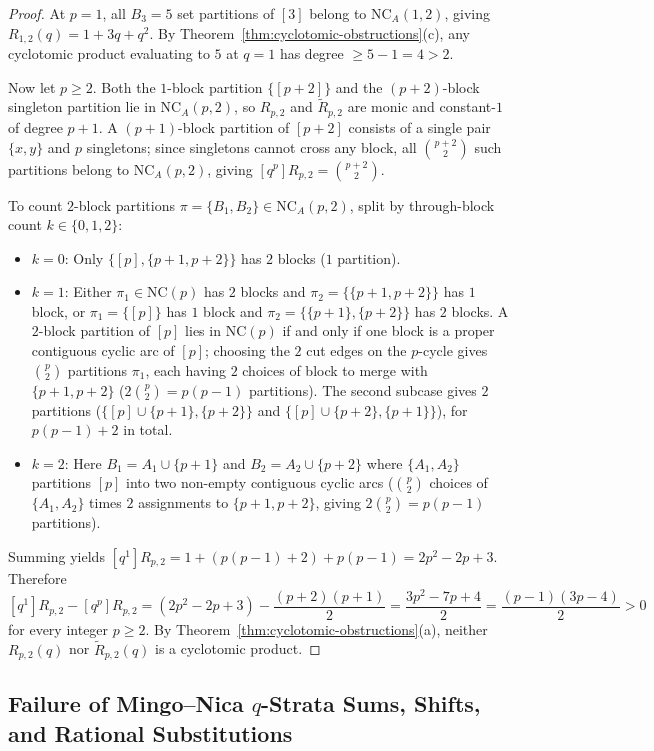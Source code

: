 \documentclass[11pt,a4paper]{article}
\theoremstyle{definition}
\theoremstyle{remark}
\newcommand{\NCA}{\mathrm{NC}_A}
\newcommand{\NC}{\mathrm{NC}}
\begin{document}
\begin{proof}
At $p = 1$, all $B_3 = 5$ set partitions of $[3]$ belong to $\NCA(1,2)$, giving $R_{1,2}(q) = 1 + 3q + q^2$. By Theorem~\ref{thm:cyclotomic-obstructions}(c), any cyclotomic product evaluating to $5$ at $q = 1$ has degree $\ge 5 - 1 = 4 > 2$.

Now let $p \ge 2$. Both the $1$-block partition $\{[p+2]\}$ and the $(p+2)$-block singleton partition lie in $\NCA(p,2)$, so $R_{p,2}$ and $\tilde{R}_{p,2}$ are monic and constant-$1$ of degree $p+1$. A $(p+1)$-block partition of $[p+2]$ consists of a single pair $\{x,y\}$ and $p$ singletons; since singletons cannot cross any block, all $\binom{p+2}{2}$ such partitions belong to $\NCA(p,2)$, giving $[q^p]R_{p,2} = \binom{p+2}{2}$.

To count $2$-block partitions $\pi = \{B_1, B_2\} \in \NCA(p,2)$, split by through-block count $k \in \{0,1,2\}$:
\begin{itemize}
  \item $k = 0$: Only $\{[p], \{p+1,p+2\}\}$ has $2$ blocks ($1$ partition).
  \item $k = 1$: Either $\pi_1 \in \NC(p)$ has $2$ blocks and $\pi_2 = \{\{p+1,p+2\}\}$ has $1$ block, or $\pi_1 = \{[p]\}$ has $1$ block and $\pi_2 = \{\{p+1\},\{p+2\}\}$ has $2$ blocks. A $2$-block partition of $[p]$ lies in $\NC(p)$ if and only if one block is a proper contiguous cyclic arc of $[p]$; choosing the $2$ cut edges on the $p$-cycle gives $\binom{p}{2}$ partitions $\pi_1$, each having $2$ choices of block to merge with $\{p+1,p+2\}$ ($2\binom{p}{2} = p(p-1)$ partitions). The second subcase gives $2$ partitions ($\{[p] \cup \{p+1\}, \{p+2\}\}$ and $\{[p] \cup \{p+2\}, \{p+1\}\}$), for $p(p-1) + 2$ in total.
  \item $k = 2$: Here $B_1 = A_1 \cup \{p+1\}$ and $B_2 = A_2 \cup \{p+2\}$ where $\{A_1,A_2\}$ partitions $[p]$ into two non-empty contiguous cyclic arcs ($\binom{p}{2}$ choices of $\{A_1,A_2\}$ times $2$ assignments to $\{p+1,p+2\}$, giving $2\binom{p}{2} = p(p-1)$ partitions).
\end{itemize}
Summing yields $[q^1]R_{p,2} = 1 + (p(p-1)+2) + p(p-1) = 2p^2 - 2p + 3$. Therefore
\[
  [q^1]R_{p,2} - [q^p]R_{p,2} = (2p^2 - 2p + 3) - \frac{(p+2)(p+1)}{2} = \frac{3p^2 - 7p + 4}{2} = \frac{(p-1)(3p-4)}{2} > 0
\]
for every integer $p \ge 2$. By Theorem~\ref{thm:cyclotomic-obstructions}(a), neither $R_{p,2}(q)$ nor $\tilde{R}_{p,2}(q)$ is a cyclotomic product.
\end{proof}

\subsection{Failure of Mingo--Nica \texorpdfstring{$q$}{q}-Strata Sums, Shifts, and Rational Substitutions}
\end{document}
